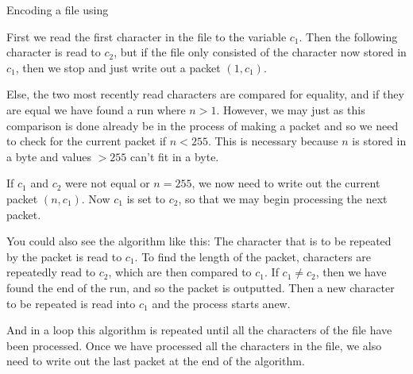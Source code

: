 \begin{algorithm}
  \caption{Encoding a file using \rle}
  \label{alg:rle-enc}
  \begin{algorithmic}[1]


    \While{\True}


    \If{\eof}
    \Break
    \EndIf

    \Else
    \State {}
    \State {}

    \EndIf

    \EndWhile

    \State {}
    \State {}
  \end{algorithmic}
\end{algorithm}

First we read the first character in the file to the variable
$c_1$. Then the following character is read to $c_2$, but if the file
only consisted of the character now stored in $c_1$, then we stop and
just write out a packet $(1,c_1)$.

Else, the two most recently read characters are compared for equality,
and if they are equal we have found a run where $n > 1$. However, we
may just as this comparison is done already be in the process of
making a packet and so we need to check for the current packet if $n <
255$. This is necessary because $n$ is stored in a byte and values $>
255$ can't fit in a byte.

If $c_1$ and $c_2$ were not equal or $n = 255$, we now need to write
out the current packet $(n,c_1)$. Now $c_1$ is set to $c_2$, so that
we may begin processing the next packet.

You could also see the algorithm like this: The character that is to
be repeated by the packet is read to $c_1$. To find the length of the
packet, characters are repeatedly read to $c_2$, which are then
compared to $c_1$. If $c_1 \neq c_2$, then we have found the end of
the run, and so the packet is outputted. Then a new character to be
repeated is read into $c_1$ and the process starts anew.

And in a loop this algorithm is repeated until all the characters of
the file have been processed. Once we have processed all the
characters in the file, we also need to write out the last packet at
the end of the algorithm.


